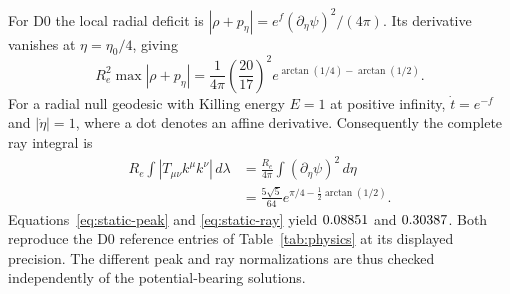 For D0 the local radial deficit is
$|\rho+p_\eta|=e^f(\partial_\eta\psi)^2/(4\pi)$. Its derivative vanishes
at $\eta=\eta_0/4$, giving
\begin{equation}
R_e^2\max|\rho+p_\eta|=
 \frac{1}{4\pi}\left(\frac{20}{17}\right)^2
 e^{\arctan(1/4)-\arctan(1/2)}.
\label{eq:static-peak}
\end{equation}
For a radial null geodesic with Killing energy $E=1$ at positive infinity,
$\dot t=e^{-f}$ and $|\dot\eta|=1$, where a dot denotes an affine derivative.
Consequently the complete ray integral is
\begin{equation}
\begin{split}
R_e\int|T_{\mu\nu}k^\mu k^\nu|\,d\lambda
 &=\frac{R_e}{4\pi}\int(\partial_\eta\psi)^2\,d\eta\\
 &=\frac{5\sqrt5}{64}
   e^{\pi/4-\frac12\arctan(1/2)}.
\end{split}
\label{eq:static-ray}
\end{equation}
Equations~\eqref{eq:static-peak} and \eqref{eq:static-ray} yield
$0.08851$ and $0.30387$. Both reproduce the D0
reference entries of Table~\ref{tab:physics} at its displayed precision.
The different peak and ray normalizations are thus checked independently
of the potential-bearing solutions.
